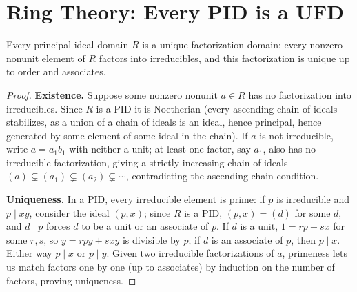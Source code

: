 \section{Ring Theory: Every PID is a UFD}

\begin{theorem}
Every principal ideal domain $R$ is a unique factorization domain: every
nonzero nonunit element of $R$ factors into irreducibles, and this
factorization is unique up to order and associates.
\end{theorem}

\begin{proof}
\textbf{Existence.} Suppose some nonzero nonunit $a \in R$ has no
factorization into irreducibles. Since $R$ is a PID it is Noetherian
(every ascending chain of ideals stabilizes, as a union of a chain of
ideals is an ideal, hence principal, hence generated by some element of
some ideal in the chain). If $a$ is not irreducible, write $a = a_1 b_1$
with neither a unit; at least one factor, say $a_1$, also has no
irreducible factorization, giving a strictly increasing chain of ideals
$(a) \subsetneq (a_1) \subsetneq (a_2) \subsetneq \cdots$, contradicting the
ascending chain condition.

\textbf{Uniqueness.} In a PID, every irreducible element is prime: if $p$
is irreducible and $p \mid xy$, consider the ideal $(p, x)$; since $R$ is a
PID, $(p,x) = (d)$ for some $d$, and $d \mid p$ forces $d$ to be a unit or
an associate of $p$. If $d$ is a unit, $1 = rp + sx$ for some $r,s$, so
$y = rpy + sxy$ is divisible by $p$; if $d$ is an associate of $p$, then
$p \mid x$. Either way $p \mid x$ or $p \mid y$. Given two irreducible
factorizations of $a$, primeness lets us match factors one by one (up to
associates) by induction on the number of factors, proving uniqueness.
\end{proof}
